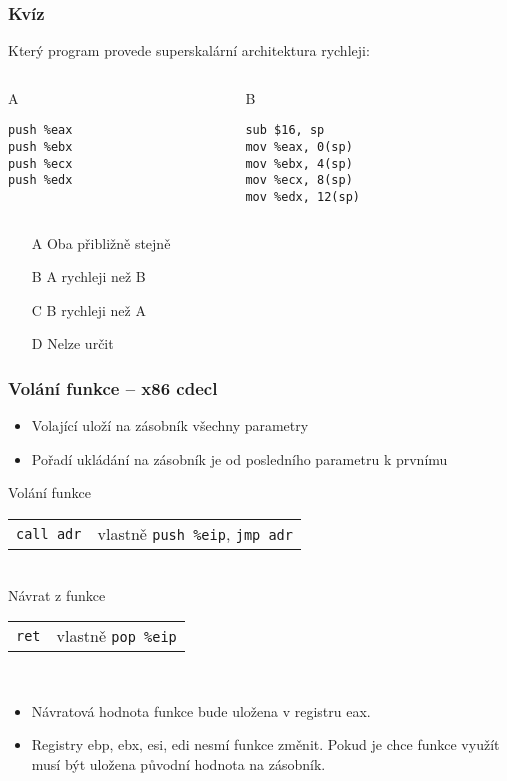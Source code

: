 \documentclass{beamer}
\begin{document}
\begin{frame}[fragile]
\frametitle{Kvíz}

Který program provede superskalární architektura rychleji:
\begin{columns}
\begin{column}{0.45\textwidth}
A
\begin{verbatim}
push %eax
push %ebx
push %ecx
push %edx
\end{verbatim}
\end{column}
\hfill
\begin{column}{0.45\textwidth}  
B
\begin{verbatim}
sub $16, sp
mov %eax, 0(sp)
mov %ebx, 4(sp)
mov %ecx, 8(sp)
mov %edx, 12(sp)
\end{verbatim}
\end{column}
\end{columns}

\begin{itemize}
\item[A] Oba přibližně stejně
\item[B] A rychleji než B
\item[C] B rychleji než A
\item[D] Nelze určit
\end{itemize}
\end{frame}

\begin{frame}
\frametitle{Volání funkce -- x86 cdecl}

\begin{itemize}
\item Volající uloží na zásobník všechny parametry
\item Pořadí ukládání na zásobník je od posledního parametru k prvnímu
\end{itemize}

\bigskip

Volání funkce\\
\begin{tabular}{ l l}
\texttt{call adr} &         vlastně \texttt{push \%eip}, \texttt{jmp adr}\\
\end{tabular}\\
Návrat z funkce\\
\begin{tabular}{ l l}
\texttt{ret} &              vlastně \texttt{pop \%eip}\\
\end{tabular}\\
\bigskip

\begin{itemize}
\item Návratová hodnota funkce bude uložena v registru eax.
\item Registry ebp, ebx, esi, edi nesmí funkce změnit. Pokud je chce funkce využít musí být uložena původní hodnota na zásobník.
\end{itemize}

\end{frame}
\end{document}
